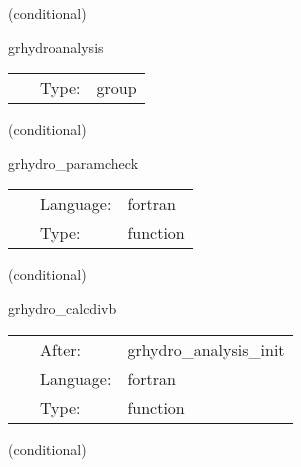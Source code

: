 \vspace{5mm}

   (conditional) 

\hspace{5mm} grhydroanalysis 

\hspace{5mm}{\it calculate analysis quantities } 


\hspace{5mm}

 \begin{tabular*}{160mm}{cll} 
~ & Type:  & group \\ 
\end{tabular*} 


\vspace{5mm}

   (conditional) 

\hspace{5mm} grhydro\_paramcheck 

\hspace{5mm}{\it check parameters } 


\hspace{5mm}

 \begin{tabular*}{160mm}{cll} 
~ & Language:  & fortran \\ 
~ & Type:  & function \\ 
\end{tabular*} 


\vspace{5mm}

   (conditional) 

\hspace{5mm} grhydro\_calcdivb 

\hspace{5mm}{\it calculate divb } 


\hspace{5mm}

 \begin{tabular*}{160mm}{cll} 
~ & After:  & grhydro\_analysis\_init \\ 
~ & Language:  & fortran \\ 
~ & Type:  & function \\ 
\end{tabular*} 


\vspace{5mm}

   (conditional) 

